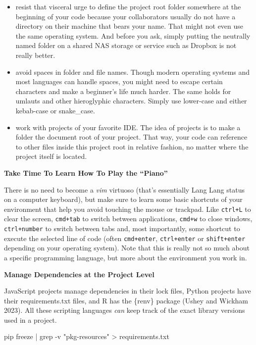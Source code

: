 \documentclass[
  12pt,
  letterpaper,
]{krantz}
\newenvironment{Shaded}{\begin{snugshade}}{\end{snugshade}}
\newcommand{\AttributeTok}[1]{\textcolor[rgb]{0.40,0.45,0.13}{#1}}
\newcommand{\ExtensionTok}[1]{\textcolor[rgb]{0.00,0.23,0.31}{#1}}
\newcommand{\FunctionTok}[1]{\textcolor[rgb]{0.28,0.35,0.67}{#1}}
\newcommand{\KeywordTok}[1]{\textcolor[rgb]{0.00,0.23,0.31}{#1}}
\newcommand{\NormalTok}[1]{\textcolor[rgb]{0.00,0.23,0.31}{#1}}
\newcommand{\OperatorTok}[1]{\textcolor[rgb]{0.37,0.37,0.37}{#1}}
\newcommand{\StringTok}[1]{\textcolor[rgb]{0.13,0.47,0.30}{#1}}
\begin{document}
\begin{itemize}
\item
  resist that visceral urge to define the project root folder somewhere
  at the beginning of your code because your collaborators usually do
  not have a directory on their machine that bears your name. That might
  not even use the same operating system. And before you ask, simply
  putting the neutrally named folder on a shared NAS storage or service
  such as Dropbox is not really better.
\item
  avoid spaces in folder and file names. Though modern operating systems
  and most languages can handle spaces, you might need to escape certain
  characters and make a beginner's life much harder. The same holds for
  umlauts and other hieroglyphic characters. Simply use lower-case and
  either kebab-case or snake\_case.
\item
  work with projects of your favorite IDE. The idea of projects is to
  make a folder the document root of your project. That way, your code
  can reference to other files inside this project root in relative
  fashion, no matter where the project itself is located.
\end{itemize}

\textbf{Take Time To Learn How To Play the ``Piano''}

There is no need to become a \emph{vim} virtuoso (that's essentially
Lang Lang status on a computer keyboard), but make sure to learn some
basic shortcuts of your environment that help you avoid touching the
mouse or trackpad. Like \texttt{ctrl+L} to clear the screen,
\texttt{cmd+tab} to switch between applications, \texttt{cmd+w} to close
windows, \texttt{ctrl+number} to switch between tabs and, most
importantly, some shortcut to execute the selected line of code (often
\texttt{cmd+enter}, \texttt{ctrl+enter} or \texttt{shift+enter}
depending on your operating system). Note that this is really not so
much about a specific programming language, but more about the
environment you work in.

\textbf{Manage Dependencies at the Project Level}

JavaScript projects manage dependencies in their lock
files, Python projects have their requirements.txt files, and R has the
\{renv\} package (Ushey and Wickham 2023). All these scripting languages
\emph{can} keep track of the exact library versions used in a project.

\begin{Shaded}
\begin{Highlighting}[]
\ExtensionTok{pip}\NormalTok{ freeze }\KeywordTok{|}
 \FunctionTok{grep} \AttributeTok{{-}v} \StringTok{"pkg{-}resources"} \OperatorTok{\textgreater{}}\NormalTok{ requirements.txt}
\end{Highlighting}
\end{Shaded}
\end{document}
